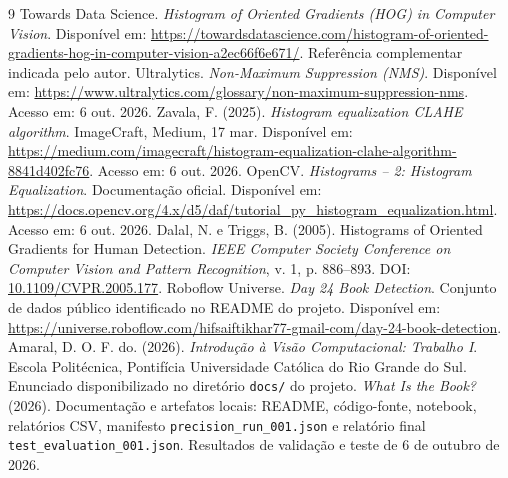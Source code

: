 \documentclass[12pt,a4paper,twocolumn]{article}
\begin{document}
\begin{thebibliography}{9}
 Towards Data Science. \textit{Histogram of Oriented Gradients (HOG) in Computer Vision}. Disponível em: \url{https://towardsdatascience.com/histogram-of-oriented-gradients-hog-in-computer-vision-a2ec66f6e671/}. Referência complementar indicada pelo autor.
 Ultralytics. \textit{Non-Maximum Suppression (NMS)}. Disponível em: \url{https://www.ultralytics.com/glossary/non-maximum-suppression-nms}. Acesso em: 6 out. 2026.
 Zavala, F. (2025). \textit{Histogram equalization CLAHE algorithm}. ImageCraft, Medium, 17 mar. Disponível em: \url{https://medium.com/imagecraft/histogram-equalization-clahe-algorithm-8841d402fc76}. Acesso em: 6 out. 2026.
 OpenCV. \textit{Histograms -- 2: Histogram Equalization}. Documentação oficial. Disponível em: \url{https://docs.opencv.org/4.x/d5/daf/tutorial_py_histogram_equalization.html}. Acesso em: 6 out. 2026.
 Dalal, N. e Triggs, B. (2005). Histograms of Oriented Gradients for Human Detection. \textit{IEEE Computer Society Conference on Computer Vision and Pattern Recognition}, v. 1, p. 886--893. DOI: \href{https://doi.org/10.1109/CVPR.2005.177}{10.1109/CVPR.2005.177}.
 Roboflow Universe. \textit{Day 24 Book Detection}. Conjunto de dados público identificado no README do projeto. Disponível em: \url{https://universe.roboflow.com/hifsaiftikhar77-gmail-com/day-24-book-detection}.
 Amaral, D. O. F. do. (2026). \textit{Introdução à Visão Computacional: Trabalho I}. Escola Politécnica, Pontifícia Universidade Católica do Rio Grande do Sul. Enunciado disponibilizado no diretório \texttt{docs/} do projeto.
 \textit{What Is the Book?} (2026). Documentação e artefatos locais: README, código-fonte, notebook, relatórios CSV, manifesto \texttt{precision\_run\_001.json} e relatório final \texttt{test\_evaluation\_001.json}. Resultados de validação e teste de 6 de outubro de 2026.
\end{thebibliography}
\end{document}
